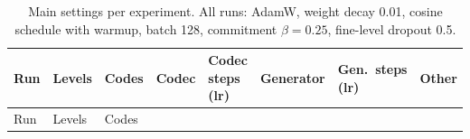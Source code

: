 \documentclass[
  british,
]{article}
\begin{document}
\begin{longtable}[]{@{}
  >{\raggedright\arraybackslash}p{}
  >{\raggedright\arraybackslash}p{}
  >{\raggedright\arraybackslash}p{}
  >{\raggedright\arraybackslash}p{}
  >{\raggedright\arraybackslash}p{}
  >{\raggedright\arraybackslash}p{}
  >{\raggedright\arraybackslash}p{}
  >{\raggedright\arraybackslash}p{}@{}}
\caption{Main settings per experiment. All runs: AdamW, weight decay
0.01, cosine schedule with warmup, batch 128, commitment
\(\beta = 0.25\), fine-level dropout 0.5.}\tabularnewline
\toprule\noalign{}
\begin{minipage}[b]{\linewidth}\raggedright
Run
\end{minipage} & \begin{minipage}[b]{\linewidth}\raggedright
Levels
\end{minipage} & \begin{minipage}[b]{\linewidth}\raggedright
Codes
\end{minipage} & \begin{minipage}[b]{\linewidth}\raggedright
Codec
\end{minipage} & \begin{minipage}[b]{\linewidth}\raggedright
Codec steps (lr)
\end{minipage} & \begin{minipage}[b]{\linewidth}\raggedright
Generator
\end{minipage} & \begin{minipage}[b]{\linewidth}\raggedright
Gen.~steps (lr)
\end{minipage} & \begin{minipage}[b]{\linewidth}\raggedright
Other
\end{minipage} \\
\midrule\noalign{}
\endfirsthead
\toprule\noalign{}
\begin{minipage}[b]{\linewidth}\raggedright
Run
\end{minipage} & \begin{minipage}[b]{\linewidth}\raggedright
Levels
\end{minipage} & \begin{minipage}[b]{\linewidth}\raggedright
Codes
\end{minipage} & \begin{minipage}[b]{\linewidth}\raggedright

\end{minipage}
\end{longtable}
\end{document}
